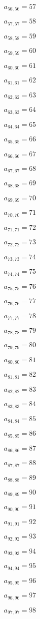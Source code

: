 \documentclass[a4paper,12pt]{article}
\begin{document}
$a _{ 56, 56 } = 57$

$a _{ 57, 57 } = 58$

$a _{ 58, 58 } = 59$

$a _{ 59, 59 } = 60$

$a _{ 60, 60 } = 61$

$a _{ 61, 61 } = 62$

$a _{ 62, 62 } = 63$

$a _{ 63, 63 } = 64$

$a _{ 64, 64 } = 65$

$a _{ 65, 65 } = 66$

$a _{ 66, 66 } = 67$

$a _{ 67, 67 } = 68$

$a _{ 68, 68 } = 69$

$a _{ 69, 69 } = 70$

$a _{ 70, 70 } = 71$

$a _{ 71, 71 } = 72$

$a _{ 72, 72 } = 73$

$a _{ 73, 73 } = 74$

$a _{ 74, 74 } = 75$

$a _{ 75, 75 } = 76$

$a _{ 76, 76 } = 77$

$a _{ 77, 77 } = 78$

$a _{ 78, 78 } = 79$

$a _{ 79, 79 } = 80$

$a _{ 80, 80 } = 81$

$a _{ 81, 81 } = 82$

$a _{ 82, 82 } = 83$

$a _{ 83, 83 } = 84$

$a _{ 84, 84 } = 85$

$a _{ 85, 85 } = 86$

$a _{ 86, 86 } = 87$

$a _{ 87, 87 } = 88$

$a _{ 88, 88 } = 89$

$a _{ 89, 89 } = 90$

$a _{ 90, 90 } = 91$

$a _{ 91, 91 } = 92$

$a _{ 92, 92 } = 93$

$a _{ 93, 93 } = 94$

$a _{ 94, 94 } = 95$

$a _{ 95, 95 } = 96$

$a _{ 96, 96 } = 97$

$a _{ 97, 97 } = 98$
\end{document}
